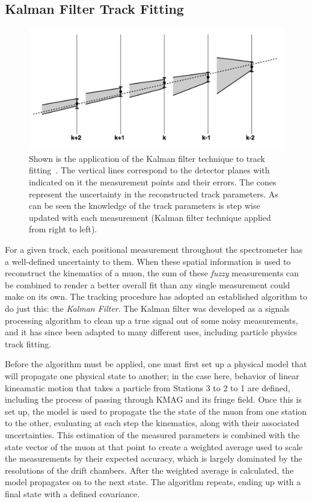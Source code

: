 \subsection{Kalman Filter Track Fitting}

\begin{figure}
	\centering
	\includegraphics[height=0.3\textheight]{figures/analysis/kalman-steps.png}
	\caption{Shown is the application of the Kalman filter technique to track fitting~\cite{vanderEijk:2002sp}. The vertical lines correspond to the detector planes with indicated on it the measurement points and their errors. The cones represent the uncertainty in the reconstructed track parameters. As can be seen the knowledge of the track parameters is step wise updated with each measurement (Kalman filter technique applied from right to left).}
	\label{fig:kalman-steps}
\end{figure}

For a given track, each positional measurement throughout the spectrometer has a well-defined uncertainty to them. When these spatial information is used to reconstruct the kinematics of a muon, the sum of these \emph{fuzzy} measurements can be combined to render a better overall fit than any single measurement could make on its own. The tracking procedure has adopted an established algorithm to do just this: the \emph{Kalman Filter}\cite{kalman:1960}. The Kalman filter was developed as a signals processing algorithm to clean up a true signal out of some noisy measurements, and it has since been adapted to many different uses, including particle physics track fitting.

Before the algorithm must be applied, one must first set up a physical model that will propagate one physical state to another; in the case here, behavior of linear kineamatic motion that takes a particle from Stations 3 to 2 to 1 are defined, including the process of passing through KMAG and its fringe field. Once this is set up, the model is used to propagate the the state of the muon from one station to the other, evaluating at each step the kinematics, along with their associated uncertainties. This estimation of the measured parameters is combined with the state vector of the muon at that point to create a weighted average used to scale the measurements by their expected accuracy, which is largely dominated by the resolutions of the drift chambers. After the weighted average is calculated, the model propagates on to the next state. The algorithm repeats, ending up with a final state with a defined covariance.

